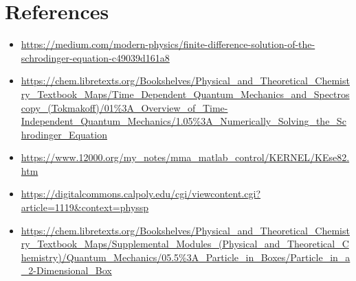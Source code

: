 \documentclass[10pt, oneside, letterpaper]{article}
\begin{document}
\newpage
\section{References}

\begin{itemize}
    \item\url{https://medium.com/modern-physics/finite-difference-solution-of-the-schrodinger-equation-c49039d161a8}
    \item\url{https://chem.libretexts.org/Bookshelves/Physical_and_Theoretical_Chemistry_Textbook_Maps/Time_Dependent_Quantum_Mechanics_and_Spectroscopy_(Tokmakoff)/01%3A_Overview_of_Time-Independent_Quantum_Mechanics/1.05%3A_Numerically_Solving_the_Schrodinger_Equation}
    \item\url{https://www.12000.org/my_notes/mma_matlab_control/KERNEL/KEse82.htm}
    \item\url{https://digitalcommons.calpoly.edu/cgi/viewcontent.cgi?article=1119&context=physsp}
    \item\url{https://chem.libretexts.org/Bookshelves/Physical_and_Theoretical_Chemistry_Textbook_Maps/Supplemental_Modules_(Physical_and_Theoretical_Chemistry)/Quantum_Mechanics/05.5%3A_Particle_in_Boxes/Particle_in_a_2-Dimensional_Box}
\end{itemize}
\end{document}
